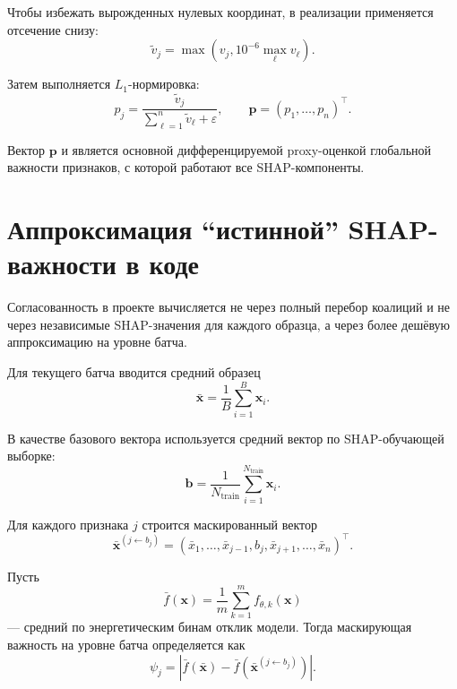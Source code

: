 \documentclass[11pt]{article}
\begin{document}
Чтобы избежать вырожденных нулевых координат, в реализации применяется отсечение снизу:
\begin{equation}
 \tilde{v}_j = \max\!\left(v_j, 10^{-6} \max_{\ell} v_{\ell}\right).
\end{equation}

Затем выполняется $L_1$-нормировка:
\begin{equation}
 p_j = \frac{\tilde{v}_j}{\sum_{\ell=1}^{n} \tilde{v}_{\ell} + \varepsilon},
 \qquad
 \mathbf{p} = (p_1,\dots,p_n)^\top.
\end{equation}

Вектор $\mathbf{p}$ и является основной дифференцируемой proxy-оценкой глобальной важности признаков, с которой работают все SHAP-компоненты.

\section{Аппроксимация ``истинной'' SHAP-важности в коде}

Согласованность в проекте вычисляется не через полный перебор коалиций и не через независимые SHAP-значения для каждого образца, а через более дешёвую аппроксимацию на уровне батча.

Для текущего батча вводится средний образец
\begin{equation}
\bar{\mathbf{x}} = \frac{1}{B} \sum_{i=1}^{B} \mathbf{x}_i.
\end{equation}

В качестве базового вектора используется средний вектор по SHAP-обучающей выборке:
\begin{equation}
\mathbf{b} = \frac{1}{N_{\mathrm{train}}} \sum_{i=1}^{N_{\mathrm{train}}} \mathbf{x}_i.
\end{equation}

Для каждого признака $j$ строится маскированный вектор
\begin{equation}
\bar{\mathbf{x}}^{(j \leftarrow b_j)} = (\bar{x}_1,\dots,\bar{x}_{j-1}, b_j, \bar{x}_{j+1},\dots,\bar{x}_n)^\top.
\end{equation}

Пусть
\begin{equation}
\bar{f}(\mathbf{x}) = \frac{1}{m} \sum_{k=1}^{m} f_{\theta,k}(\mathbf{x})
\end{equation}
--- средний по энергетическим бинам отклик модели. Тогда маскирующая важность на уровне батча определяется как
\begin{equation}
 \psi_j = \left| \bar{f}(\bar{\mathbf{x}}) - \bar{f}(\bar{\mathbf{x}}^{(j \leftarrow b_j)}) \right|.
\end{equation}
\end{document}
